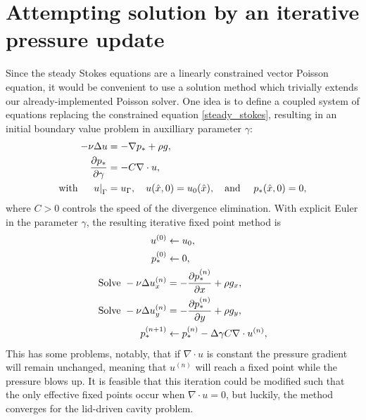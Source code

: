 \section{Attempting solution by an iterative pressure update}
Since the steady Stokes equations are a linearly constrained vector Poisson equation,
it would be convenient to use a solution method which trivially extends our already-implemented Poisson solver.
One idea is to define a coupled system of equations replacing the constrained equation \eqref{steady_stokes}, resulting in an initial boundary value problem
in auxilliary parameter $\gamma$:
\begin{equation}
\begin{split}
    -\nu\Delta u &= -\nabla p_* + \rho g,\\
    \frac{\partial p_*}{\partial \gamma} &= -C\nabla\cdot u,\\
    \text{with \quad} \left.u\right|_\Gamma &= u_\Gamma,\quad u(\hat{x}, 0) = u_0(\hat{x}), \text{\quad and \quad} p_*(\hat{x}, 0) = 0,
\end{split}
\end{equation}
where $C > 0$ controls the speed of the divergence elimination.
With explicit Euler in the parameter $\gamma$, the resulting iterative fixed point method is
\begin{equation}
\begin{split}
    u^{(0)} &\leftarrow u_0,\\
    p_*^{(0)} &\leftarrow 0,\\
    \text{Solve } -\nu\Delta u_x^{(n)} &= -\frac{\partial p_*^{(n)}}{\partial x} + \rho g_x,\\
    \text{Solve } -\nu\Delta u_y^{(n)} &= -\frac{\partial p_*^{(n)}}{\partial y} + \rho g_y,\\
    p_*^{(n+1)} &\leftarrow p_*^{(n)} - \Delta\gamma C\nabla\cdot u^{(n)},
\end{split}
\end{equation}
This has some problems, notably, that if $\nabla\cdot u$ is constant the pressure gradient will remain unchanged, meaning
that $u^{(n)}$ will reach a fixed point while the pressure blows up. It is feasible that this iteration could be modified such that the only
effective fixed points occur when $\nabla\cdot u = 0$, but luckily, the method converges for the lid-driven cavity problem.


